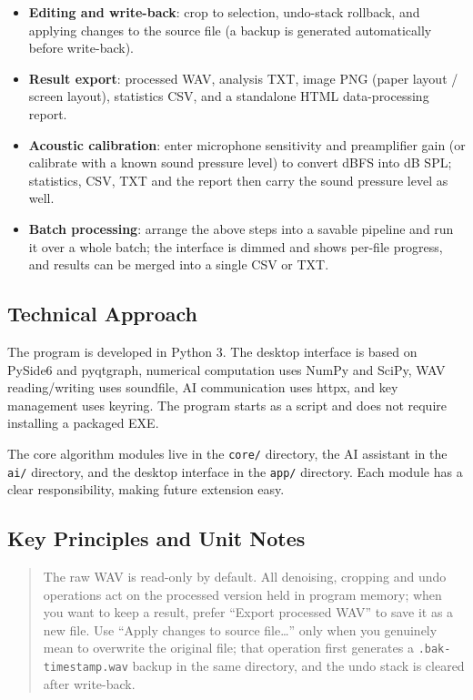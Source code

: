 \documentclass[UTF8,a4paper,12pt]{ctexart}
\begin{document}
\begin{itemize}
  \item \textbf{Editing and write-back}: crop to selection, undo-stack rollback, and applying changes to the source file (a backup is generated automatically before write-back).
  \item \textbf{Result export}: processed WAV, analysis TXT, image PNG (paper layout / screen layout), statistics CSV, and a standalone HTML data-processing report.
  \item \textbf{Acoustic calibration}: enter microphone sensitivity and preamplifier gain (or calibrate with a known sound pressure level) to convert dBFS into dB SPL; statistics, CSV, TXT and the report then carry the sound pressure level as well.
  \item \textbf{Batch processing}: arrange the above steps into a savable pipeline and run it over a whole batch; the interface is dimmed and shows per-file progress, and results can be merged into a single CSV or TXT.
\end{itemize}

\subsection{Technical Approach}

The program is developed in Python 3. The desktop interface is based on PySide6 and pyqtgraph, numerical computation uses NumPy and SciPy, WAV reading/writing uses soundfile, AI communication uses httpx, and key management uses keyring. The program starts as a script and does not require installing a packaged EXE.

The core algorithm modules live in the \texttt{core/} directory, the AI assistant in the \texttt{ai/} directory, and the desktop interface in the \texttt{app/} directory. Each module has a clear responsibility, making future extension easy.

\subsection{Key Principles and Unit Notes}

\begin{quote}
The raw WAV is read-only by default. All denoising, cropping and undo operations act on the processed version held in program memory; when you want to keep a result, prefer ``Export processed WAV'' to save it as a new file. Use ``Apply changes to source file\dots'' only when you genuinely mean to overwrite the original file; that operation first generates a \texttt{.bak-timestamp.wav} backup in the same directory, and the undo stack is cleared after write-back.
\end{quote}
\end{document}
